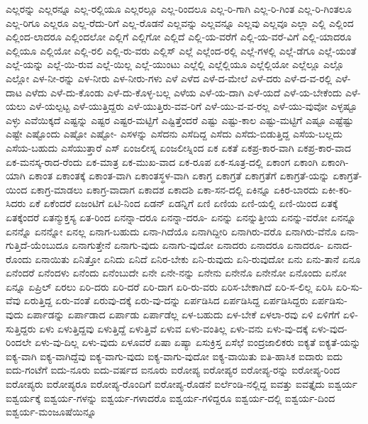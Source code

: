{ಎಲ್ಲರನ್ನು
ಎಲ್ಲರನ್ನೂ
ಎಲ್ಲ-ರಲ್ಲಿಯೂ
ಎಲ್ಲರಲ್ಲೂ
ಎಲ್ಲ-ರಿಂದಲೂ
ಎಲ್ಲ-ರಿ-ಗಾಗಿ
ಎಲ್ಲ-ರಿ-ಗಿಂತ
ಎಲ್ಲ-ರಿ-ಗಿಂತಲೂ
ಎಲ್ಲ-ರಿಗೂ
ಎಲ್ಲರೂ
ಎಲ್ಲ-ರೆದು-ರಿಗೆ
ಎಲ್ಲ-ರೊಡನೆ
ಎಲ್ಲವನ್ನು
ಎಲ್ಲವನ್ನೂ
ಎಲ್ಲವು
ಎಲ್ಲವೂ
ಎಲ್ಲಾ
ಎಲ್ಲಿ
ಎಲ್ಲಿಂದ
ಎಲ್ಲಿಂದ-ಲಾದರೂ
ಎಲ್ಲಿಂದಲೋ
ಎಲ್ಲಿಗೆ
ಎಲ್ಲಿಗೋ
ಎಲ್ಲಿದೆ
ಎಲ್ಲಿ-ಯ-ವರೆಗೆ
ಎಲ್ಲಿ-ಯ-ವರೆ-ವಿಗೆ
ಎಲ್ಲಿ-ಯಾದರೂ
ಎಲ್ಲಿಯೂ
ಎಲ್ಲಿಯೋ
ಎಲ್ಲಿ-ರಲಿ
ಎಲ್ಲಿ-ರು-ವರು
ಎಲ್ಲಿಸ್
ಎಲ್ಲೆ
ಎಲ್ಲೆಂದ-ರಲ್ಲಿ
ಎಲ್ಲೆ-ಗಳಲ್ಲಿ
ಎಲ್ಲೆ-ಡೆಗೂ
ಎಲ್ಲೆ-ಯಂತೆ
ಎಲ್ಲೆ-ಯನ್ನು
ಎಲ್ಲೆ-ಯಿ-ರುವ
ಎಲ್ಲೆ-ಯಿಲ್ಲ
ಎಲ್ಲೆ-ಯುಂಟು
ಎಲ್ಲೆಲ್ಲಿ
ಎಲ್ಲೆಲ್ಲಿಯೂ
ಎಲ್ಲೆಲ್ಲಿಯೋ
ಎಲ್ಲೆಲ್ಲೂ
ಎಲ್ಲೊ
ಎಲ್ಲೋ
ಎಳ-ನೀ-ರನ್ನು
ಎಳ-ನೀರು
ಎಳ-ನೀರು-ಗಳು
ಎಳೆ
ಎಳೆದ
ಎಳೆ-ದ-ಮೇಲೆ
ಎಳೆ-ದರು
ಎಳೆ-ದ-ವ-ರಲ್ಲಿ
ಎಳೆ-ದಾಟ
ಎಳೆದು
ಎಳೆ-ದು-ಕೊಂಡು
ಎಳೆ-ದು-ಕೊಳ್ಳ-ಬಲ್ಲ
ಎಳೆಯ
ಎಳೆ-ಯ-ದಾಗಿ
ಎಳೆ-ಯದೆ
ಎಳೆ-ಯ-ಬೇಕೆಂದು
ಎಳೆ-ಯಲು
ಎಳೆ-ಯಲ್ಪಟ್ಟ
ಎಳೆ-ಯುತ್ತಿದ್ದರು
ಎಳೆ-ಯುತ್ತಿರು-ವವ-ರಿಗೆ
ಎಳೆ-ಯು-ವ-ವ-ರಲ್ಲ
ಎಳೆ-ಯು-ವುವೋ
ಎಳ್ಳಷ್ಟೂ
ಎಳ್ಳು
ಎವೆಯಿಕ್ಕದೆ
ಎಷ್ಟನ್ನು
ಎಷ್ಟರ
ಎಷ್ಟರ-ಮಟ್ಟಿಗೆ
ಎಷ್ಟಿತ್ತೆಂದರೆ
ಎಷ್ಟು
ಎಷ್ಟು-ಕಾಲ
ಎಷ್ಟು-ಮಟ್ಟಿಗೆ
ಎಷ್ಟೂ
ಎಷ್ಟೆಷ್ಟು
ಎಷ್ಟೇ
ಎಷ್ಟೊಂದು
ಎಷ್ಟೋ
ಎಷ್ಟೋ-
ಎಸಳನ್ನು
ಎಸೆದನು
ಎಸೆದಿದ್ದ
ಎಸೆದು
ಎಸೆದು-ಬಿಡುತ್ತಿದ್ದ
ಎಸೆಯ-ಬಲ್ಲದು
ಎಸೆಯ-ಬಹುದು
ಎಸೆಯುತ್ತಾರೆ
ಎಸ್
ಏಂಜಲೀಸ್ನ
ಏಂಜಲೀಸ್ನಿಂದ
ಏಕ
ಏಕತೆ
ಏಕಪ್ರ-ಕಾರ-ವಾಗಿ
ಏಕಪ್ರ-ಕಾರ-ವಾದ
ಏಕ-ಮನಸ್ಕ-ರಾದ-ರೆಂದು
ಏಕ-ಮಾತ್ರ
ಏಕ-ಮುಖ-ವಾದ
ಏಕ-ರೂಪ
ಏಕ-ಸೂತ್ರ-ದಲ್ಲಿ
ಏಕಾಂಗ
ಏಕಾಂಗಿ
ಏಕಾಂಗಿ-ಯಾಗಿ
ಏಕಾಂತ
ಏಕಾಂತಕ್ಕೆ
ಏಕಾಂತ-ವಾಗಿ
ಏಕಾಂತಸ್ಥಳ-ವಾಗಿ
ಏಕಾಗ್ರ
ಏಕಾಗ್ರತೆ
ಏಕಾಗ್ರತೆಗೆ
ಏಕಾಗ್ರತೆ-ಯನ್ನು
ಏಕಾಗ್ರತೆ-ಯಿಂದ
ಏಕಾಗ್ರ-ಮಾಡಲು
ಏಕಾಗ್ರ-ವಾದಾಗ
ಏಕಾದಶ
ಏಕಾದಶಿ
ಏಕಾ-ಸನ-ದಲ್ಲಿ
ಏಕಿನ್ನೂ
ಏಕಿರ-ಬಾರದು
ಏಕೀ-ಕರಿ-ಸಿದರು
ಏಕೆ
ಏಕೆಂದರೆ
ಏಜಂಟಿಗೆ
ಏಟಿ-ನಿಂದ
ಏಡನ್
ಏಡನ್ನಿಗೆ
ಏಣಿ
ಏಣಿಯ
ಏಣಿ-ಯಲ್ಲಿ
ಏಣಿ-ಯಿಂದ
ಏತಕ್ಕೆ
ಏತಕ್ಕೆಂದರೆ
ಏತನ್ಮುಕ್ತಸ್ಯ
ಏತ-ರಿಂದ
ಏನನ್ನಾ-ದರೂ
ಏನನ್ನಾ-ದರೂ-
ಏನನ್ನು
ಏನನ್ನುತ್ತೀಯ
ಏನನ್ನು-ವರೋ
ಏನನ್ನೂ
ಏನನ್ನೊ
ಏನನ್ನೋ
ಏನಲ್ಲ
ಏನಾಗ-ಬಹುದು
ಏನಾ-ಗಿದೆಯೊ
ಏನಾಗಿದ್ದೀರಿ
ಏನಾಗಿರು-ವರೊ
ಏನಾಗಿರು-ವೆನೊ
ಏನಾ-ಗುತ್ತಿದೆ-ಯೆಂಬುದೂ
ಏನಾಗುತ್ತೇನೆ
ಏನಾಗು-ವುದು
ಏನಾಗು-ವುದೋ
ಏನಾದರು
ಏನಾದರೂ
ಏನಾದರೂ-
ಏನಾದ-ರೊಂದು
ಏನಾಯಿತು
ಏನಿತ್ತೋ
ಏನಿದು
ಏನಿದೆ
ಏನಿರ-ಬೇಕು
ಏನಿ-ರುವುದು
ಏನಿ-ರುವುದೋ
ಏನು
ಏನು-ತಾನೆ
ಏನೂ
ಏನೆಂದರೆ
ಏನೆಂದಳು
ಏನೆಂದು
ಏನೆಂಬುದೇ
ಏನೇ
ಏನೇ-ನನ್ನು
ಏನೇನು
ಏನೇನೊ
ಏನೇನೋ
ಏನೊಂದು
ಏನೋ
ಏನ್ನೂ
ಏಪ್ರಿಲ್
ಏರಲು
ಏರಿ-ದರು
ಏರಿ-ದರೆ
ಏರಿ-ದಾಗ
ಏರಿ-ರು-ವರು
ಏರಿಸ-ಬೇಕಾಗಿದೆ
ಏರಿ-ಸ-ಲಿಲ್ಲ
ಏರಿಸಿ
ಏರಿ-ಸು-ವೆವು
ಏರುತ್ತಿದ್ದ
ಏರು-ವಂತೆ
ಏರುವು-ದಕ್ಕೆ
ಏರು-ವು-ದನ್ನು
ಏರ್ಪಡಿಸಿದ
ಏರ್ಪಡಿಸಿದ್ದ
ಏರ್ಪಡಿಸಿದ್ದರು
ಏರ್ಪಡಿಸು-ವುದು
ಏರ್ಪಾಡನ್ನು
ಏರ್ಪಾಡಾದ
ಏರ್ಪಾಡು
ಏರ್ಪಾಡೆಲ್ಲ
ಏಳ-ಬಹುದು
ಏಳ-ಬೇಕೆ
ಏಳಲಾ-ರವು
ಏಳಿ
ಏಳಿಗೆಗೆ
ಏಳಿ-ಸುತ್ತಿದ್ದರು
ಏಳು
ಏಳುತ್ತಿದ್ದವು
ಏಳುತ್ತಿದ್ದೆ
ಏಳುತ್ತಿವೆ
ಏಳುವ
ಏಳು-ವಂತಿಲ್ಲ
ಏಳು-ವನು
ಏಳು-ವು-ದಕ್ಕೆ
ಏಳು-ವುದ-ರಿಂದಲೇ
ಏಳು-ವು-ದಿಲ್ಲ
ಏಳು-ವುದು
ಏಳೂವರೆ
ಏಷಾ
ಏಷ್ಯಾ
ಏಸುಕ್ರಿಸ್ತ
ಏಸೆಛೆ
ಐಂದ್ರಜಾಲಿಕರು
ಐಕ್ಯತೆ
ಐಕ್ಯತೆ-ಯನ್ನು
ಐಕ್ಯ-ವಾಗಿ
ಐಕ್ಯ-ವಾಗಿದ್ದೆವು
ಐಕ್ಯ-ವಾಗು-ವುದು
ಐಕ್ಯ-ವಾಗು-ವುದೋ
ಐಕ್ಯ-ವಾಯಿತು
ಐತಿ-ಹಾಸಿಕ
ಐದಾರು
ಐದು
ಐದು-ಗಂಟೆಗೆ
ಐದು-ನೂರು
ಐದು-ವರ್ಷದ
ಐನೂರು
ಐರೋಪ್ಯ
ಐರೋಪ್ಯರ
ಐರೋಪ್ಯ-ರನ್ನು
ಐರೋಪ್ಯ-ರಿಂದ
ಐರೋಪ್ಯರು
ಐರೋಪ್ಯರೂ
ಐರೋಪ್ಯ-ರೊಂದಿಗೆ
ಐರೋಪ್ಯ-ರೊಡನೆ
ಐರ್ಲೆಂಡಿ-ನಲ್ಲಿದ್ದ
ಐವತ್ತು
ಐವತ್ತೈದು
ಐಶ್ವರ್ಯ
ಐಶ್ವರ್ಯಕ್ಕೆ
ಐಶ್ವರ್ಯ-ಗಳನ್ನು
ಐಶ್ವರ್ಯ-ಗಳಾದರೊ
ಐಶ್ವರ್ಯ-ಗಳಿದ್ದರೂ
ಐಶ್ವರ್ಯ-ದಲ್ಲಿ
ಐಶ್ವರ್ಯ-ದಿಂದ
ಐಶ್ವರ್ಯ-ಮಂಜೂಷೆಯಿನ್ನೂ
}
